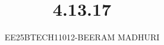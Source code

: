 \documentclass[journal]{IEEEtran}
\begin{document}

\vspace{3cm}

\title{4.13.17}
\author{EE25BTECH11012-BEERAM MADHURI}
{\let\newpage\relax\maketitle}

\renewcommand{\thefigure}{\theenumi}
\renewcommand{\thetable}{\theenumi}
\setlength{\intextsep}{10pt} %


\renewcommand{\thetable}{\theenumi}
\end{document}
